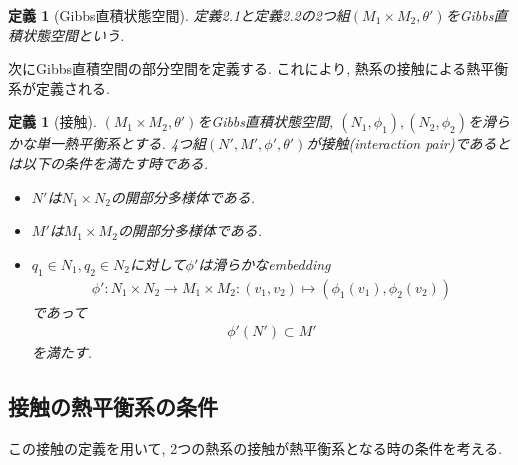 \documentclass[a4paper,12pt]{ltjsarticle}
\theoremstyle{break}
\newtheorem{defn}[thm]{定義}
\newcommand{\mt}{\mapsto}
\newcommand{\ti}{\times}
\numberwithin{equation}{section}
\begin{document}
\begin{defn}[Gibbs直積状態空間]
  定義2.1と定義2.2の2つ組$(M_1 \ti M_2,\theta')$をGibbs直積状態空間という. 
\end{defn}

次にGibbs直積空間の部分空間を定義する. 
これにより, 熱系の接触による熱平衡系が定義される.

\begin{defn}[接触]
  $(M_1 \ti M_2,\theta')$をGibbs直積状態空間, $(N_1,\phi_1), (N_2,\phi_2)$を滑らかな単一熱平衡系とする. 
  4つ組$(N',M',\phi',\theta')$が接触(interaction pair)であるとは以下の条件を満たす時である. 
  \begin{itemize}
    \item $N'$は$N_1 \ti N_2$の開部分多様体である.
    \item $M'$は$M_1 \ti M_2$の開部分多様体である.
    \item $q_1 \in N_1, q_2 \in N_2$に対して$\phi'$は滑らかなembedding 
    \begin{align*}
      \phi': N_1 \ti N_2 \to M_1 \ti M_2: (v_1,v_2) \mt (\phi_1(v_1), \phi_2(v_2))
    \end{align*}
    であって
    \begin{align*}
      \phi'(N') \subset M'
    \end{align*}
    を満たす. 
  \end{itemize}
\end{defn}

\subsection{接触の熱平衡系の条件}

この接触の定義を用いて, 2つの熱系の接触が熱平衡系となる時の条件を考える. 
\end{document}
